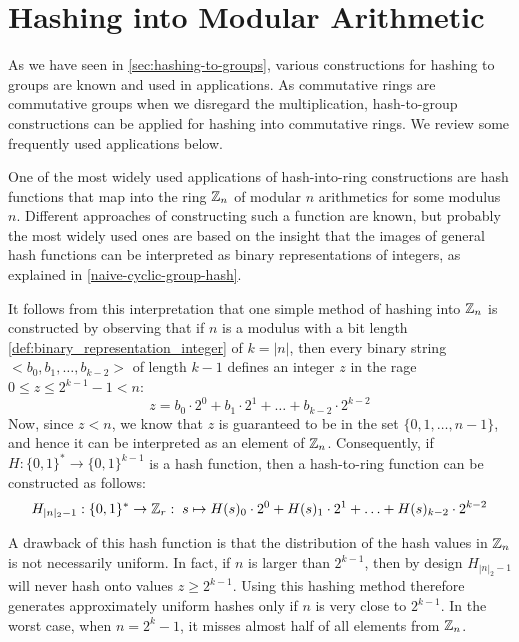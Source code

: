 \section{Hashing into Modular Arithmetic}
\label{hash-to-modular-arithmetics}
As we have seen in \secname{} \ref{sec:hashing-to-groups}, various constructions for hashing to groups are known and used in applications. As commutative rings are commutative groups when we disregard the multiplication, hash-to-group constructions can be applied for hashing into commutative rings.  We review some frequently used applications below.


One of the most widely used applications of hash-into-ring constructions are hash functions that map into the ring $\mathbb{Z}_n$ of modular $n$ arithmetics for some modulus $n$. Different approaches of constructing such a function are known, but probably the most widely used ones are based on the insight that the images of general hash functions can be interpreted as binary representations of integers, as explained in \examplename{} \ref{naive-cyclic-group-hash}.

It follows from this interpretation that one simple method of hashing into $\mathbb{Z}_n$ is constructed by observing that if $n$ is a modulus with a bit length \eqref{def:binary_representation_integer} of $k=|n|$, then every binary string $<b_0,b_1,\ldots,b_{k-2}>$ of length $k-1$ defines an integer $z$ in the rage $0\leq z \leq 2^{k-1}-1< n $:
\begin{equation}
z = b_0\cdot 2^0 + b_1\cdot 2^1 + \ldots + b_{k-2}\cdot 2^{k-2}
\end{equation}
Now, since $z<n$, we know that $z$ is guaranteed to be in the set $\{0,1,\ldots,n-1\}$, and hence it can be interpreted as an element of $\mathbb{Z}_n$. Consequently, if $H:\{0,1\}^*\to\{0,1\}^{k-1}$ is a hash function, then a hash-to-ring function can be constructed as follows:
\begin{equation}\label{eq:hash-Zr}
H_{|n|_2-1}: \{0,1\}^* \to \mathbb{Z}_r: \; s \mapsto
H(s)_0\cdot 2^0 + H(s)_1\cdot 2^1 + \ldots + H(s)_{k-2}\cdot 2^{k-2}
\end{equation}

A drawback of this hash function is that the distribution of the hash values in $\mathbb{Z}_n$ is not necessarily uniform. In fact, if $n$ is larger than $2^{k-1}$, then by design $H_{|n|_2-1}$ will never hash onto values $z\geq 2^{k-1}$. Using this hashing method therefore generates approximately uniform hashes only if $n$ is very close to $2^{k-1}$. In the worst case, when $n=2^k-1$, it misses almost half of all elements from $\mathbb{Z}_n$.

